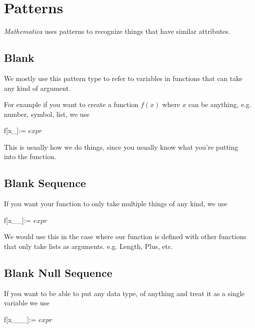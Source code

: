 \documentclass[11pt,letterpaper,twoside,titlepage]{book}
\newcommand{\Mathematica}{\textit{Mathematica} }
\begin{document}
		\chapter{Patterns}
		
			\Mathematica uses patterns to recognize things that have similar attributes.
		
			\section{Blank}
			
				We mostly use this pattern type to refer to variables in functions that can take any kind of argument.  
				
				For example if you want to create a function $f(x)$ where $x$ can be anything, e.g. number, symbol, list, we use 
				
				\begin{center}
				
					f[x\_]:= $expr$
				
				\end{center}
				
				This is usually how we do things, since you usually know what you're putting into the function.
				
			\section{Blank Sequence}
			
				If you want your function to only take multiple things of any kind, we use
				
				\begin{center}
				
					f[x\_\_]:= $expr$
				
				\end{center}
				
				We would use this in the case where our function is defined with other functions that only take lists as arguments. e.g. Length, Plus, etc.
				
			\section{Blank Null Sequence}
			
				If you want to be able to put any data type, of anything and treat it as a single variable we use 
				
				\begin{center}
				
					f[x\_\_\_]:= $expr$
				
				\end{center}
				
\end{document}
